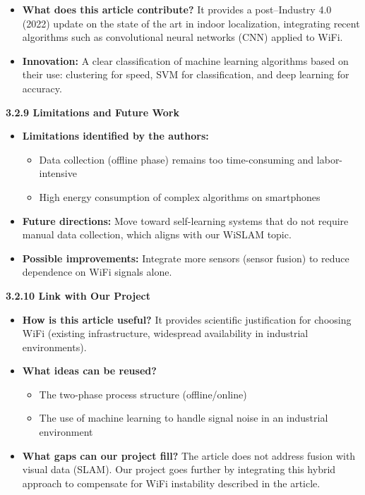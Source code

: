 \documentclass{ipgpmaster}
\begin{document}
\begin{itemize}
    \item \textbf{What does this article contribute?}
 It provides a post–Industry 4.0 (2022) update on the state of the art in indoor localization, integrating recent algorithms such as convolutional neural networks (CNN) applied to WiFi.

    \item \textbf{Innovation:}
 A clear classification of machine learning algorithms based on their use: clustering for speed, SVM for classification, and deep learning for accuracy. 


\end{itemize}
\textbf{3.2.9      Limitations and Future Work}

\begin{itemize}
    \item \textbf{Limitations identified by the authors:} 
    \begin{itemize}
        \item Data collection (offline phase) remains too time-consuming and labor-intensive 
        \item High energy consumption of complex algorithms on smartphones 



    \end{itemize}
    \item \textbf{Future directions:}
 Move toward self-learning systems that do not require manual data collection, which aligns with our WiSLAM topic. 

    \item \textbf{Possible improvements:}
Integrate more sensors (sensor fusion) to reduce dependence on WiFi signals alone.


\end{itemize}

\textbf{3.2.10    Link with Our Project}
\begin{itemize}
    \item \textbf{How is this article useful?}
 It provides scientific justification for choosing WiFi (existing infrastructure, widespread availability in industrial environments). 

    \item \textbf{What ideas can be reused?} 
    \begin{itemize}
        \item The two-phase process structure (offline/online) 
        \item The use of machine learning to handle signal noise in an industrial environment 

    \end{itemize}
    \item \textbf{What gaps can our project fill?}
 The article does not address fusion with visual data (SLAM). Our project goes further by integrating this hybrid approach to compensate for WiFi instability described in the article. 
\end{itemize}
\end{document}
